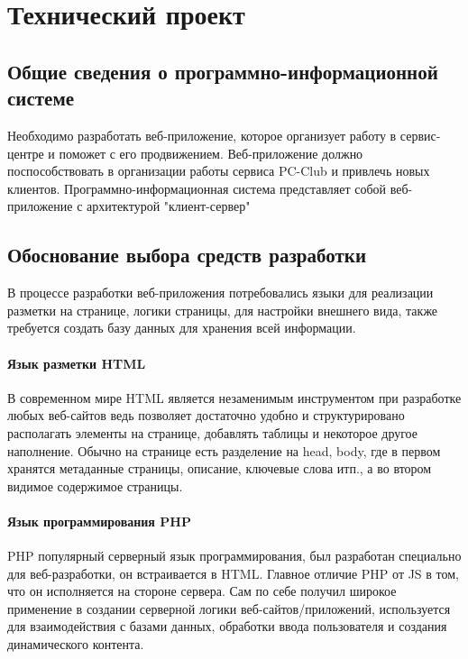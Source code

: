 \section{Технический проект}
\subsection{Общие сведения о программно-информационной системе}

Необходимо разработать веб-приложение, которое организует работу в сервис-центре и поможет с его продвижением. Веб-приложение должно поспособствовать в организации работы сервиса PC-Club и привлечь новых клиентов. Программно-информационная система представляет собой веб-приложение с архитектурой "клиент-сервер"

\subsection{Обоснование выбора средств разработки}

В процессе разработки веб-приложения потребовались языки для реализации разметки на странице, логики страницы, для настройки внешнего вида, также требуется создать базу данных для хранения всей информации. 

\paragraph{Язык разметки HTML}

В современном мире HTML является незаменимым инструментом при разработке любых веб-сайтов ведь позволяет достаточно удобно и структурировано располагать элементы на странице, добавлять таблицы и некоторое другое наполнение. Обычно на странице есть разделение на head, body, где в первом хранятся метаданные страницы, описание, ключевые слова итп., а во втором видимое содержимое страницы.

\paragraph{Язык программирования PHP}

PHP популярный серверный язык программирования, был разработан специально для веб-разработки, он встраивается в HTML. Главное отличие PHP от JS в том, что он исполняется на стороне сервера. Сам по себе получил широкое применение в создании серверной логики веб-сайтов/приложений, используется для взаимодействия с базами данных, обработки ввода пользователя и создания динамического контента.

